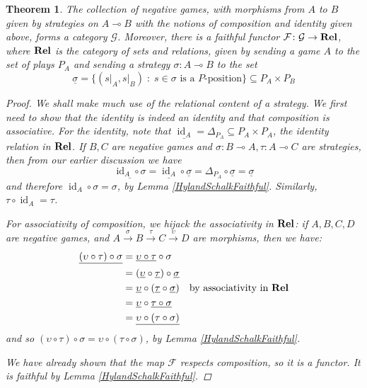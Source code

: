 \documentclass[11pt]{article} %
\theoremstyle{plain} %
\newtheorem{theorem}{Theorem}[section]
\theoremstyle{definition} %
\theoremstyle{note}
\theoremstyle{exercisestyle}
\newcommand{\catname}[1]{{\normalfont\textbf{#1}}}
\newcommand{\Rel}{\catname{Rel}}
\newcommand{\map}[3]{#2\xrightarrow{#1} #3}
\newcommand*\from{\colon}
\DeclareMathOperator{\id}{id}
\renewcommand{\implies}{\multimap}
\newcommand{\comp}[2]{#1 \circ #2}
\newcommand{\G}{\mathcal G}
\newcommand{\suchthat}{\;\colon\;}
\newcommand{\F}{\mathcal F}
\newcommand{\grel}[1]{\underline{#1}}
\renewcommand{\subset}{\subseteq}
\begin{document}
\begin{theorem}
  \label{IsCategory}
  The collection of negative games, with morphisms from $A$ to $B$ given by strategies on $A\implies B$ with the notions of composition and identity given above, forms a category $\G$.  Moreover, there is a faithful functor $\F\from\G\to\Rel$, where $\Rel$ is the category of sets and relations, given by sending a game $A$ to the set of plays $P_A$ and sending a strategy $\sigma\from A\implies B$ to the set
  \[
    \grel{\sigma}=\{(s\vert_A,s\vert_B)\suchthat \textrm{$s\in\sigma$ is a $P$-position}\}\subset P_A\times P_B
    \]
  \begin{proof}
    We shall make much use of the relational content of a strategy.  We first need to show that the identity is indeed an identity and that composition is associative.  For the identity, note that $\grel{\id_A}=\Delta_{P_A}\subset P_A\times P_A$, the identity relation in $\Rel$.  If $B,C$ are negative games and $\sigma\colon B\implies A,\tau\colon A\implies C$ are strategies, then from our earlier discussion we have
    \[
      \grel{\comp{\id_A}{\sigma}}=\comp{\grel{\id_A}}{\grel\sigma}=\comp{\Delta_{P_A}}{\grel\sigma}=\grel\sigma
      \]
    and therefore $\comp{\id_A}{\sigma}=\sigma$, by Lemma \ref{HylandSchalkFaithful}.  Similarly, $\comp{\tau}{\id_A}=\tau$.  

    For associativity of composition, we hijack the associativity in $\Rel$: if $A,B,C,D$ are negative games, and $\map{\sigma}AB\xrightarrow{\tau}\map{\upsilon}CD$ are morphisms, then we have:
    \begin{align*}
      \grel{\comp{(\comp\upsilon\tau)}{\sigma}} & = \comp{\grel{\comp\upsilon\tau}}{\sigma} \\
        & = \comp{(\comp{\grel\upsilon}{\grel\tau})}{\grel\sigma} \\
        & = \comp{\grel\upsilon}{(\comp{\grel\tau}{\grel\sigma})} \quad\textrm{by associativity in $\Rel$} \\
        & = \comp{\grel\upsilon}{\grel{\comp\tau\sigma}} \\
        & = \grel{\comp{\upsilon}{(\comp\tau\sigma)}}
    \end{align*}
    and so $\comp{(\comp\upsilon\tau)}{\sigma}=\comp{\upsilon}{(\comp\tau\sigma)}$, by Lemma \ref{HylandSchalkFaithful}.  

    We have already shown that the map $\F$ respects composition, so it is a functor.  It is faithful by Lemma \ref{HylandSchalkFaithful}.
  \end{proof}
\end{theorem}
\end{document}
